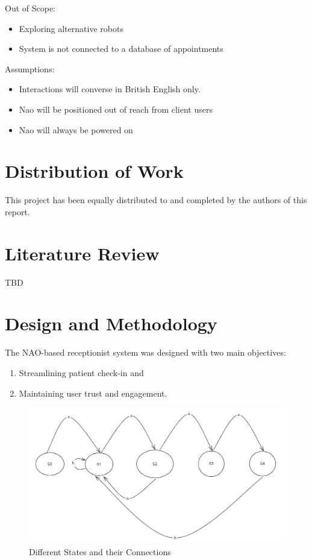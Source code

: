 \documentclass[conference]{IEEEtran}
\begin{document}
Out of Scope:
\begin{itemize}
        \item Exploring alternative robots
        \item System is not connected to a database of appointments 
\end{itemize}

Assumptions:
\begin{itemize}
        \item Interactions will converse in British English only.
        \item Nao will be positioned out of reach from client users
        \item Nao will always be powered on
\end{itemize}

\section{Distribution of Work} This project has been equally distributed to and completed by the authors of this report.

\section{Literature Review}

TBD

\section{Design and Methodology}

The NAO-based receptionist system was designed with two main objectives:
\begin{enumerate}
        \item Streamlining patient check-in and
        \item Maintaining user trust and engagement.
\end{enumerate}

\begin{figure}
        \centering
        \includegraphics[width=.6\linewidth]{states.jpg}
        \caption{Different States and their Connections}
        \label{Different states}
\end{figure}
\end{document}
